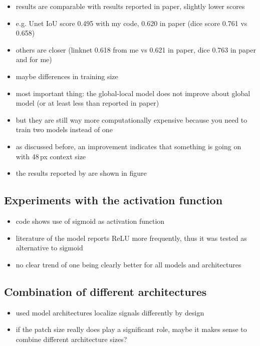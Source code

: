 \begin{itemize}
	\item results are comparable with results reported in paper, slightly lower scores
	\item e.g. Unet IoU score 0.495 with my code, 0.620 in paper (dice score 0.761 vs 0.658)
	\item others are closer (linknet 0.618 from me vs 0.621 in paper, dice 0.763 in paper and for me)
	\item maybe differences in training size
	\item most important thing: the global-local model does not improve about global model (or at least less than reported in paper)
	\item but they are still way more computationally expensive because you need to train two models instead of one
	\item as discussed before, an improvement indicates that something is going on with 48\,px context size
	\item the results reported by \citeauthor{Oota_2023_WACV} are shown in figure
\end{itemize}

\subsection{Experiments with the activation function}

\begin{itemize}
	\item code shows use of sigmoid as activation function
	\item literature of the model reports ReLU more frequently, thus it was tested as alternative to sigmoid
	\item no clear trend of one being clearly better for all models and architectures
\end{itemize}

\subsection{Combination of different architectures}

\begin{itemize}
	\item used model architectures localize signals differently by design
	\item if the patch size really does play a significant role, maybe it makes sense to combine different architecture sizes?
\end{itemize}
